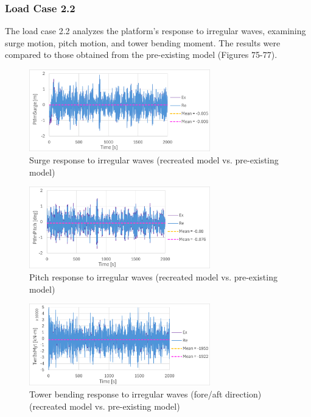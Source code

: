 \documentclass[a4paper, 11pt]{article}
\begin{document}
\newpage
\subsubsection{Load Case 2.2}
\hspace*{0.5cm}The load case 2.2 analyzes the platform's response to irregular waves, examining surge motion, pitch motion, and tower bending moment. The results were compared to those obtained from the pre-existing model (Figures 75-77). 

\begin{figure}[H]
    \centering
    \includegraphics[width=0.7\textwidth]{2.2_surge_mine.png}
    \caption{\small Surge response to irregular waves (recreated model vs. pre-existing model)}
    \label{fig:2.2_surge_mine}
\end{figure}

\begin{figure}[H]
    \centering
    \includegraphics[width=0.7\textwidth]{2.2_pitch_mine.png}
    \caption{\small Pitch response to irregular waves (recreated model vs. pre-existing model)}
    \label{fig:2.2_pitch_mine}
\end{figure}

\begin{figure}[H]
    \centering
    \includegraphics[width=0.7\textwidth]{2.2_twr_mine.png}
    \caption{\small Tower bending response to irregular waves (fore/aft direction) (recreated model vs. pre-existing model)}
    \label{fig:2.2_twr_mine}
\end{figure}
\end{document}
